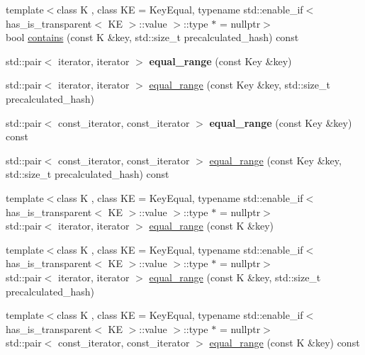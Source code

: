 \begin{DoxyCompactItemize}
\item 
{\footnotesize template$<$class K , class KE  = Key\+Equal, typename std\+::enable\+\_\+if$<$ has\+\_\+is\+\_\+transparent$<$ K\+E $>$\+::value $>$\+::type $\ast$  = nullptr$>$ }\\bool \mbox{\hyperlink{classtsl_1_1ordered__map_a0f9c85b500e88728e72e5a12f9a18fdc}{contains}} (const K \&key, std\+::size\+\_\+t precalculated\+\_\+hash) const
\item 
\mbox{\label{classtsl_1_1ordered__map_ac21e4c55711af0f75449253a56c6a870}} 
std\+::pair$<$ iterator, iterator $>$ {\bfseries equal\+\_\+range} (const Key \&key)
\item 
std\+::pair$<$ iterator, iterator $>$ \mbox{\hyperlink{classtsl_1_1ordered__map_afcf5604ae7a129818d0da106492d0593}{equal\+\_\+range}} (const Key \&key, std\+::size\+\_\+t precalculated\+\_\+hash)
\item 
\mbox{\label{classtsl_1_1ordered__map_a849a8a4c784c518eb3bf54973debc74b}} 
std\+::pair$<$ const\+\_\+iterator, const\+\_\+iterator $>$ {\bfseries equal\+\_\+range} (const Key \&key) const
\item 
std\+::pair$<$ const\+\_\+iterator, const\+\_\+iterator $>$ \mbox{\hyperlink{classtsl_1_1ordered__map_a14b67de05a0a1d3e59468a0d64a0bc89}{equal\+\_\+range}} (const Key \&key, std\+::size\+\_\+t precalculated\+\_\+hash) const
\item 
{\footnotesize template$<$class K , class KE  = Key\+Equal, typename std\+::enable\+\_\+if$<$ has\+\_\+is\+\_\+transparent$<$ K\+E $>$\+::value $>$\+::type $\ast$  = nullptr$>$ }\\std\+::pair$<$ iterator, iterator $>$ \mbox{\hyperlink{classtsl_1_1ordered__map_ab168835676d025a969129df68922ed64}{equal\+\_\+range}} (const K \&key)
\item 
{\footnotesize template$<$class K , class KE  = Key\+Equal, typename std\+::enable\+\_\+if$<$ has\+\_\+is\+\_\+transparent$<$ K\+E $>$\+::value $>$\+::type $\ast$  = nullptr$>$ }\\std\+::pair$<$ iterator, iterator $>$ \mbox{\hyperlink{classtsl_1_1ordered__map_aa7adb3e162ace9638429c88321d7d1df}{equal\+\_\+range}} (const K \&key, std\+::size\+\_\+t precalculated\+\_\+hash)
\item 
{\footnotesize template$<$class K , class KE  = Key\+Equal, typename std\+::enable\+\_\+if$<$ has\+\_\+is\+\_\+transparent$<$ K\+E $>$\+::value $>$\+::type $\ast$  = nullptr$>$ }\\std\+::pair$<$ const\+\_\+iterator, const\+\_\+iterator $>$ \mbox{\hyperlink{classtsl_1_1ordered__map_aa9692eec4de167529fa5e5f2b04ea18d}{equal\+\_\+range}} (const K \&key) const

\end{DoxyCompactItemize}
